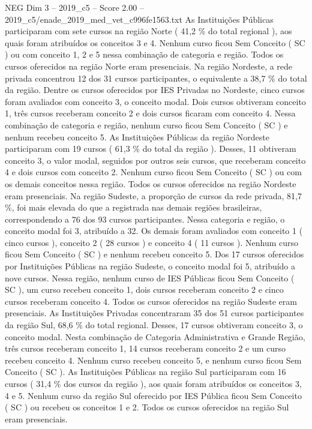 \begin{textsample}{NEG Dim 3 – 2019\_c5 – Score 2.00 – 2019\_c5/enade\_2019\_med\_vet\_c996fe1563.txt}
As Instituições Públicas participaram com sete cursos na região Norte ( 41,2 \% do total regional ), aos quais foram atribuídos os conceitos 3 e 4.
Nenhum curso ficou Sem Conceito ( SC ) ou com conceito 1, 2 e 5 nessa combinação de categoria e região.
Todos os cursos oferecidos na região Norte eram presenciais.
Na região Nordeste, a rede privada concentrou 12 dos 31 cursos participantes, o equivalente a 38,7 \% do total da região.
Dentre os cursos oferecidos por IES Privadas no Nordeste, cinco cursos foram avaliados com conceito 3, o conceito modal.
Dois cursos obtiveram conceito 1, três cursos receberam conceito 2 e dois cursos ficaram com conceito 4.
Nessa combinação de categoria e região, nenhum curso ficou Sem Conceito ( SC ) e nenhum recebeu conceito 5.
As Instituições Públicas da região Nordeste participaram com 19 cursos ( 61,3 \% do total da região ).
Desses, 11 obtiveram conceito 3, o valor modal, seguidos por outros seis cursos, que receberam conceito 4 e dois cursos com conceito 2.
Nenhum curso ficou Sem Conceito ( SC ) ou com os demais conceitos nessa região.
Todos os cursos oferecidos na região Nordeste eram presenciais.
Na região Sudeste, a proporção de cursos da rede privada, 81,7 \%, foi mais elevada do que a registrada nas demais regiões brasileiras, correspondendo a 76 dos 93 cursos participantes.
Nessa categoria e região, o conceito modal foi 3, atribuído a 32.
Os demais foram avaliados com conceito 1 ( cinco cursos ), conceito 2 ( 28 cursos ) e conceito 4 ( 11 cursos ).
Nenhum curso ficou Sem Conceito ( SC ) e nenhum recebeu conceito 5.
Dos 17 cursos oferecidos por Instituições Públicas na região Sudeste, o conceito modal foi 5, atribuído a nove cursos.
Nessa região, nenhum curso de IES Públicas ficou Sem Conceito ( SC ), um curso recebeu conceito 1, dois cursos receberam conceito 2 e cinco cursos receberam conceito 4.
Todos os cursos oferecidos na região Sudeste eram presenciais.
As Instituições Privadas concentraram 35 dos 51 cursos participantes da região Sul, 68,6 \% do total regional.
Desses, 17 cursos obtiveram conceito 3, o conceito modal.
Nesta combinação de Categoria Administrativa e Grande Região, três cursos receberam conceito 1, 14 cursos receberam conceito 2 e um curso recebeu conceito 4.
Nenhum curso recebeu conceito 5, e nenhum curso ficou Sem Conceito ( SC ).
As Instituições Públicas na região Sul participaram com 16 cursos ( 31,4 \% dos cursos da região ), aos quais foram atribuídos os conceitos 3, 4 e 5.
Nenhum curso da região Sul oferecido por IES Pública ficou Sem Conceito ( SC ) ou recebeu os conceitos 1 e 2.
Todos os cursos oferecidos na região Sul eram presenciais.

\end{textsample}
